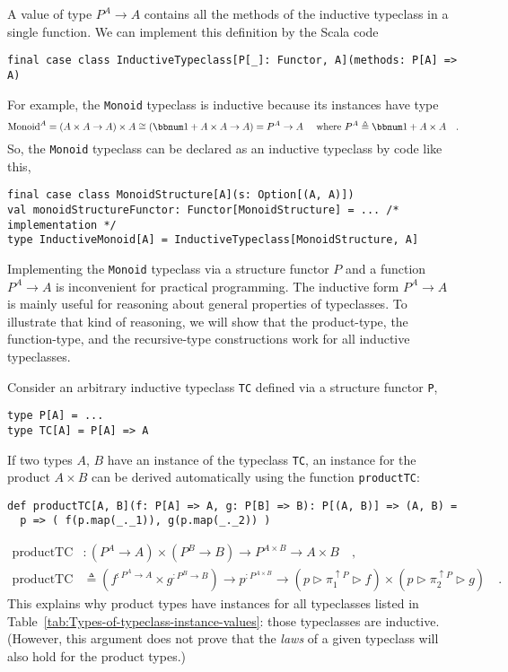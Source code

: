 A value of type $P^{A}\rightarrow A$ contains all the methods of
the inductive typeclass in a single function. We can implement this
definition by the Scala code
\begin{lstlisting}
final case class InductiveTypeclass[P[_]: Functor, A](methods: P[A] => A)
\end{lstlisting}
For example, the \lstinline!Monoid! typeclass is inductive because
its instances have type 
\[
\text{Monoid}^{A}=\left(A\times A\rightarrow A\right)\times A\cong(\bbnum 1+A\times A\rightarrow A)=P^{A}\rightarrow A\quad\text{ where }P^{A}\triangleq\bbnum 1+A\times A\quad.
\]
So, the \lstinline!Monoid! typeclass can be declared as an inductive
typeclass by code like this,
\begin{lstlisting}
final case class MonoidStructure[A](s: Option[(A, A)])
val monoidStructureFunctor: Functor[MonoidStructure] = ... /* implementation */
type InductiveMonoid[A] = InductiveTypeclass[MonoidStructure, A]
\end{lstlisting}
Implementing the \lstinline!Monoid! typeclass via a structure functor
$P$ and a function $P^{A}\rightarrow A$ is inconvenient for practical
programming. The inductive form $P^{A}\rightarrow A$ is mainly useful
for reasoning about general properties of typeclasses. To illustrate
that kind of reasoning, we will show that the product-type, the function-type,
and the recursive-type constructions work for all inductive typeclasses. 

Consider an arbitrary inductive typeclass \lstinline!TC! defined
via a structure functor \lstinline!P!,
\begin{lstlisting}
type P[A] = ...
type TC[A] = P[A] => A
\end{lstlisting}
If two types $A$, $B$ have an instance of the typeclass \lstinline!TC!,
an instance for the product $A\times B$ can be derived automatically
using the function \lstinline!productTC!:
\begin{lstlisting}
def productTC[A, B](f: P[A] => A, g: P[B] => B): P[(A, B)] => (A, B) =
  p => ( f(p.map(_._1)), g(p.map(_._2)) )
\end{lstlisting}
\begin{align*}
\text{productTC} & :(P^{A}\rightarrow A)\times(P^{B}\rightarrow B)\rightarrow P^{A\times B}\rightarrow A\times B\quad,\\
\text{productTC} & \triangleq(f^{:P^{A}\rightarrow A}\times g^{:P^{B}\rightarrow B})\rightarrow p^{:P^{A\times B}}\rightarrow(p\triangleright\pi_{1}^{\uparrow P}\triangleright f)\times(p\triangleright\pi_{2}^{\uparrow P}\triangleright g)\quad.
\end{align*}
This explains why product types have instances for all typeclasses
listed in Table~\ref{tab:Types-of-typeclass-instance-values}: those
typeclasses are inductive. (However, this argument does not prove
that the \emph{laws} of a given typeclass will also hold for the product
types.)

